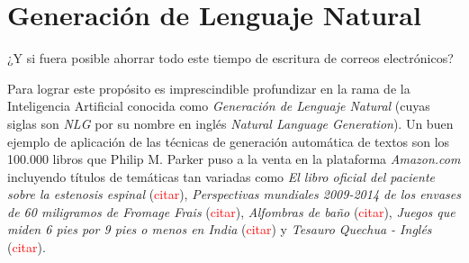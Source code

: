 \section{Generación de Lenguaje Natural}
¿Y si fuera posible ahorrar todo este tiempo de escritura de correos electrónicos?

Para lograr este propósito es imprescindible profundizar en la rama de la Inteligencia Artificial conocida como \textit{Generación de Lenguaje Natural} (cuyas siglas son \textit{NLG} por su nombre en inglés \textit{Natural Language Generation}). Un buen ejemplo de aplicación de las técnicas de generación automática de textos son los 100.000 libros que Philip M. Parker puso a la venta en la plataforma \textit{Amazon.com} incluyendo títulos de temáticas tan variadas como \textit{El libro oficial del paciente sobre la estenosis espinal} (\textcolor{red}{citar}), \textit{Perspectivas mundiales 2009-2014 de los envases de 60 miligramos de Fromage Frais} (\textcolor{red}{citar}), \textit{Alfombras de baño} (\textcolor{red}{citar}), \textit{Juegos que miden 6 pies por 9 pies o menos en India} (\textcolor{red}{citar}) y \textit{Tesauro Quechua - Inglés} (\textcolor{red}{citar}).